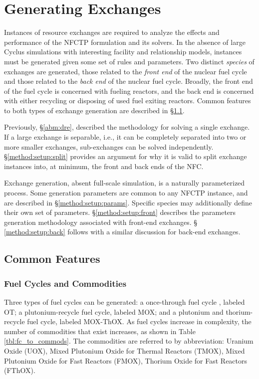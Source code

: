 
\section{Generating Exchanges}\label{method:setup}

Instances of resource exchanges are required to analyze the effects and
performance of the NFCTP formulation and its solvers. In the absence of large
Cyclus simulations with interesting facility and relationship models, instances
must be generated given some set of rules and parameters. Two distinct
\textit{species} of exchanges are generated, those related to the \textit{front
  end} of the nuclear fuel cycle and those related to the \textit{back end} of
the nuclear fuel cycle. Broadly, the front end of the fuel cycle is concerned
with fueling reactors, and the back end is concerned with either recycling or
disposing of used fuel exiting reactors. Common features to both types of
exchange generation are described in \S \ref{method:setup:features}.

Previously, \S \ref{abm:dre}, described the methodology for solving a single
exchange. If a large exchange is separable, i.e., it can be completely separated
into two or more smaller exchanges, sub-exchanges can be solved
independently. \S \ref{method:setup:split} provides an argument for why it is
valid to split exchange instances into, at minimum, the front and back ends of
the NFC.

Exchange generation, absent full-scale simulation, is a naturally parameterized
process. Some generation parameters are common to any NFCTP instance, and are
described in \S \ref{method:setup:params}. Specific species may additionally
define their own set of parameters. \S \ref{method:setup:front} describes the
parameters generation methodology associated with front-end exchanges. \S
\ref{method:setup:back} follows with a similar discussion for back-end
exchanges.

\subsection{Common Features}\label{method:setup:features}

\subsubsection{Fuel Cycles and Commodities}

Three types of fuel cycles can be generated: a once-through fuel cycle , labeled
OT; a plutonium-recycle fuel cycle, labeled MOX; and a plutonium and
thorium-recycle fuel cycle, labeled MOX-ThOX. As fuel cycles increase in
complexity, the number of commodities that exist increases, as shown in Table
\ref{tbl:fc_to_commods}. The commodities are referred to by abbreviation:
Uranium Oxide (UOX), Mixed Plutonium Oxide for Thermal Reactors (TMOX), Mixed
Plutonium Oxide for Fast Reactors (FMOX), Thorium Oxide for Fast Reactors
(FThOX).

